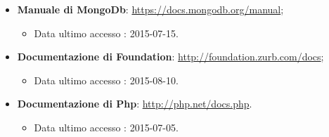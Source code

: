 \begin{itemize}
\begin{itemize}
					\item \textbf{Manuale di MongoDb}: \url{https://docs.mongodb.org/manual};
					\begin{itemize}
						\item Data ultimo accesso : 2015-07-15.						
					\end{itemize}
					
					\item \textbf{Documentazione di Foundation}: \url{http://foundation.zurb.com/docs};
					\begin{itemize}
						\item Data ultimo accesso : 2015-08-10.						
					\end{itemize}
					
					\item \textbf{Documentazione di Php}: \url{http://php.net/docs.php}.
					\begin{itemize}
						\item Data ultimo accesso : 2015-07-05.						
					\end{itemize}
					
				\end{itemize}

	\end{itemize}
